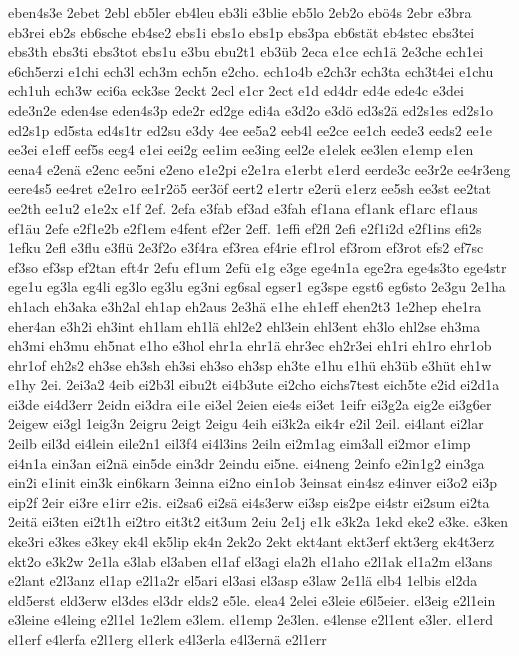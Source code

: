 {eben4s3e
2ebet
2ebl
eb5ler
eb4leu
eb3li
e3blie
eb5lo
2eb2o
ebö4s
2ebr
e3bra
eb3rei
eb2s
eb6sche
eb4se2
ebs1i
ebs1o
ebs1p
ebs3pa
eb6stät
eb4stec
ebs3tei
ebs3th
ebs3ti
ebs3tot
ebs1u
e3bu
ebu2t1
eb3üb
2eca
e1ce
ech1ä
2e3che
ech1ei
e6ch5erzi
e1chi
ech3l
ech3m
ech5n
e2cho.
ech1o4b
e2ch3r
ech3ta
ech3t4ei
e1chu
ech1uh
ech3w
eci6a
eck3se
2eckt
2ecl
e1cr
2ect
e1d
ed4dr
ed4e
ede4c
e3dei
ede3n2e
eden4se
eden4s3p
ede2r
ed2ge
edi4a
e3d2o
e3dö
ed3s2ä
ed2s1es
ed2s1o
ed2s1p
ed5sta
ed4s1tr
ed2su
e3dy
4ee
ee5a2
eeb4l
ee2ce
ee1ch
eede3
eeds2
ee1e
ee3ei
e1eff
eef5s
eeg4
e1ei
eei2g
ee1im
ee3ing
eel2e
e1elek
ee3len
e1emp
e1en
eena4
e2enä
e2enc
ee5ni
e2eno
e1e2pi
e2e1ra
e1erbt
e1erd
eerde3c
ee3r2e
ee4r3eng
eere4s5
ee4ret
e2e1ro
ee1r2ö5
eer3öf
eert2
e1ertr
e2erü
e1erz
ee5sh
ee3st
ee2tat
ee2th
ee1u2
e1e2x
e1f
2ef.
2efa
e3fab
ef3ad
e3fah
ef1ana
ef1ank
ef1arc
ef1aus
ef1äu
2efe
e2f1e2b
e2f1em
e4fent
ef2er
2eff.
1effi
ef2fl
2efi
e2f1i2d
e2f1ins
efi2s
1efku
2efl
e3flu
e3flü
2e3f2o
e3f4ra
ef3rea
ef4rie
ef1rol
ef3rom
ef3rot
efs2
ef7sc
ef3so
ef3sp
ef2tan
eft4r
2efu
ef1um
2efü
e1g
e3ge
ege4n1a
ege2ra
ege4s3to
ege4str
ege1u
eg3la
eg4li
eg3lo
eg3lu
eg3ni
eg6sal
egser1
eg3spe
egst6
eg6sto
2e3gu
2e1ha
eh1ach
eh3aka
e3h2al
eh1ap
eh2aus
2e3hä
e1he
eh1eff
ehen2t3
1e2hep
ehe1ra
eher4an
e3h2i
eh3int
eh1lam
eh1lä
ehl2e2
ehl3ein
ehl3ent
eh3lo
ehl2se
eh3ma
eh3mi
eh3mu
eh5nat
e1ho
e3hol
ehr1a
ehr1ä
ehr3ec
eh2r3ei
eh1ri
eh1ro
ehr1ob
ehr1of
eh2s2
eh3se
eh3sh
eh3si
eh3so
eh3sp
eh3te
e1hu
e1hü
eh3üb
e3hüt
eh1w
e1hy
2ei.
2ei3a2
4eib
ei2b3l
eibu2t
ei4b3ute
ei2cho
eichs7test
eich5te
e2id
ei2d1a
ei3de
ei4d3err
2eidn
ei3dra
ei1e
ei3el
2eien
eie4s
ei3et
1eifr
ei3g2a
eig2e
ei3g6er
2eigew
ei3gl
1eig3n
2eigru
2eigt
2eigu
4eih
ei3k2a
eik4r
e2il
2eil.
ei4lant
ei2lar
2eilb
eil3d
ei4lein
eile2n1
eil3f4
ei4l3ins
2eiln
ei2m1ag
eim3all
ei2mor
e1imp
ei4n1a
ein3an
ei2nä
ein5de
ein3dr
2eindu
ei5ne.
ei4neng
2einfo
e2in1g2
ein3ga
ein2i
e1init
ein3k
ein6karn
3einna
ei2no
ein1ob
3einsat
ein4sz
e4inver
ei3o2
ei3p
eip2f
2eir
ei3re
e1irr
e2is.
ei2sa6
ei2sä
ei4s3erw
ei3sp
eis2pe
ei4str
ei2sum
ei2ta
2eitä
ei3ten
ei2t1h
ei2tro
eit3t2
eit3um
2eiu
2e1j
e1k
e3k2a
1ekd
eke2
e3ke.
e3ken
eke3ri
e3kes
e3key
ek4l
ek5lip
ek4n
2ek2o
2ekt
ekt4ant
ekt3erf
ekt3erg
ek4t3erz
ekt2o
e3k2w
2e1la
e3lab
el3aben
el1af
el3agi
ela2h
el1aho
e2l1ak
el1a2m
el3ans
e2lant
e2l3anz
el1ap
e2l1a2r
el5ari
el3asi
el3asp
e3law
2e1lä
elb4
1elbis
el2da
eld5erst
eld3erw
el3des
el3dr
elds2
e5le.
elea4
2elei
e3leie
e6l5eier.
el3eig
e2l1ein
e3leine
e4leing
e2l1el
1e2lem
e3lem.
el1emp
2e3len.
e4lense
e2l1ent
e3ler.
el1erd
el1erf
e4lerfa
e2l1erg
el1erk
e4l3erla
e4l3ernä
e2l1err
}
